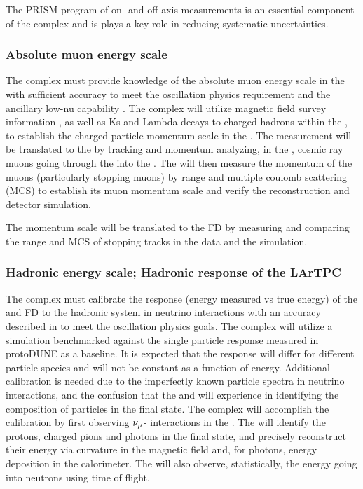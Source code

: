 The PRISM program of on- and off-axis measurements is an essential component of the   complex and is plays a key role in reducing systematic uncertainties.


\subsubsection{Absolute muon energy scale}

The   complex must provide knowledge of the absolute muon energy scale in the \larnd with sufficient accuracy to meet the oscillation physics requirement  and the ancillary low-nu capability . The complex will utilize  magnetic field survey information , as well as Ks and Lambda decays to charged hadrons  within the , to establish the charged particle momentum scale in the . 
The measurement will be translated to the \larnd by tracking and momentum analyzing, in the , cosmic ray muons going through the  into the \larnd {}. The \larnd will then measure the momentum of the muons (particularly stopping muons) by range and multiple coulomb scattering (MCS) to establish its muon momentum scale and verify the reconstruction and detector simulation. 

The momentum scale will be translated to the FD by measuring and comparing the range and MCS of stopping tracks in the data and the simulation.


\subsubsection{Hadronic energy scale; Hadronic response of the LArTPC}
The   complex must calibrate the response (energy measured vs true energy) of the \larnd and FD to the hadronic system in neutrino interactions with an accuracy described in  to meet the oscillation physics goals. The complex will utilize a simulation benchmarked against the single particle response measured in protoDUNE as a baseline. It is expected that the response will differ for different particle species and will not be constant as a function of energy. Additional calibration is needed due to the imperfectly known particle spectra in neutrino interactions, and the confusion that the    and  will experience in identifying the composition of particles in the final state. The   complex will accomplish the calibration by first observing $\nu_\mu$- interactions in the . The  will identify the protons, charged pions and photons in the final state, and precisely reconstruct their energy via curvature in the magnetic field and, for photons, energy deposition in the calorimeter. The  will also observe, statistically, the energy going into neutrons using time of flight.

